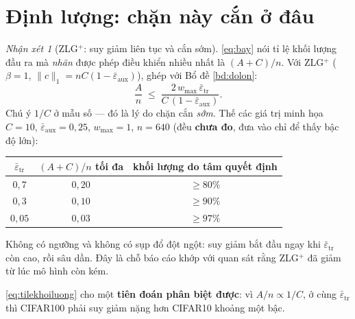 \documentclass[11pt,a4paper]{article}
\theoremstyle{remark}
\newtheorem{nhanxet}[dinhly]{Nhận xét}
\newcommand{\epstr}{\bar\varepsilon_{\mathrm{tr}}}
\newcommand{\epsaux}{\bar\varepsilon_{\mathrm{aux}}}
\begin{document}
\section{Định lượng: chặn này cắn ở đâu}
\label{sec:dinh-luong}

\begin{nhanxet}[ZLG$^+$: suy giảm liên tục và cắn sớm]
\label{nx:lientuc}
\eqref{eq:bay} nói tỉ lệ khối lượng đầu ra mà \emph{nhãn} được phép điều
khiển nhiều nhất là $(A+C)/n$. Với ZLG$^+$ ($\beta=1$,
$\|c\|_1=nC(1-\epsaux)$), ghép với Bổ đề \ref{bd:dolon}:
\begin{equation}
\frac{A}{n}\;\le\;\frac{2\,w_{\max}\,\epstr}{C\,(1-\epsaux)} .
\label{eq:tilekhoiluong}
\end{equation}
Chú ý $1/C$ ở mẫu số --- đó là lý do chặn cắn \emph{sớm}. Thế các giá trị
minh họa $C=10$, $\epsaux=0{,}25$, $w_{\max}=1$, $n=640$ (đều \textbf{chưa
đo}, đưa vào chỉ để thấy bậc độ lớn):

\begin{center}
\begin{tabular}{@{}ccc@{}}
\toprule
$\epstr$ & $(A+C)/n$ tối đa & khối lượng do tâm quyết định \\
\midrule
$0{,}7$  & $0{,}20$ & $\ge80\%$ \\
$0{,}3$  & $0{,}10$ & $\ge90\%$ \\
$0{,}05$ & $0{,}03$ & $\ge97\%$ \\
\bottomrule
\end{tabular}
\end{center}

Không có ngưỡng và không có sụp đổ đột ngột: suy giảm bắt đầu ngay khi
$\epstr$ còn cao, rồi sâu dần. Đây là chỗ báo cáo khớp với quan sát rằng
ZLG$^+$ đã giảm từ lúc mô hình còn kém.

\eqref{eq:tilekhoiluong} cho một \textbf{tiên đoán phân biệt được}: vì
$A/n\propto1/C$, ở cùng $\epstr$ thì CIFAR100 phải suy giảm nặng hơn CIFAR10
khoảng một bậc.
\end{nhanxet}
\end{document}
